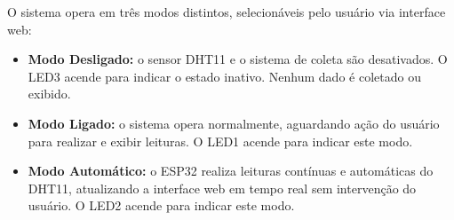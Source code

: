 O sistema opera em três modos distintos, selecionáveis pelo usuário via interface web:

\begin{itemize}
    \item \textbf{Modo Desligado:} o sensor DHT11 e o sistema de coleta são desativados.
    O LED3 acende para indicar o estado inativo. Nenhum dado é coletado ou exibido.

    \item \textbf{Modo Ligado:} o sistema opera normalmente, aguardando ação do usuário
    para realizar e exibir leituras. O LED1 acende para indicar este modo.

    \item \textbf{Modo Automático:} o ESP32 realiza leituras contínuas e automáticas
    do DHT11, atualizando a interface web em tempo real sem intervenção do usuário.
    O LED2 acende para indicar este modo.
\end{itemize}

